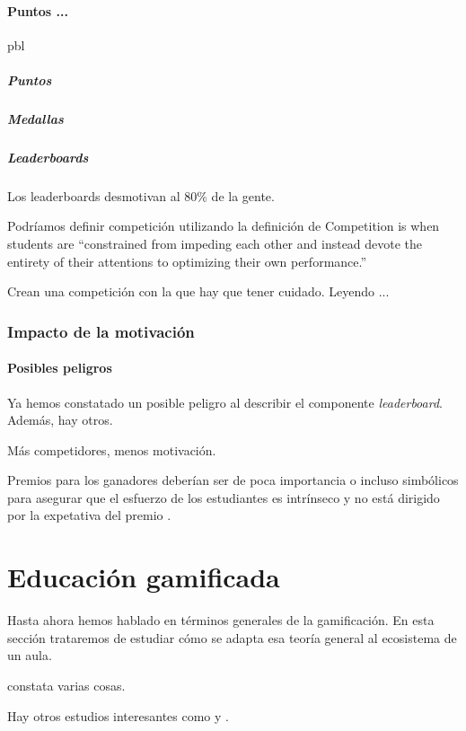 \paragraph{Puntos ...} \gls{pbl}

\subparagraph*{Puntos}

\subparagraph*{Medallas}

\subparagraph*{Leaderboards}

Los leaderboards desmotivan al 80\% de la gente. 

Podríamos definir competición utilizando la definición de \cite{Crawford_CompetitionDef} Competition is when students are “constrained from impeding each other and instead devote the entirety of their attentions to optimizing their own performance.”

Crean una competición con la que hay que tener cuidado. Leyendo \cite{CompetitionInEd}...

\subsubsection{Impacto de la motivación}

\paragraph{Posibles peligros}
\label{PosiblesPeligros}

Ya hemos constatado un posible peligro al describir el componente \textit{leaderboard}. Además, hay otros.

Más competidores, menos motivación. \cite{n-effect}

Premios para los ganadores deberían ser de poca importancia o incluso simbólicos para asegurar que el esfuerzo de los estudiantes es intrínseco y no está dirigido por la expetativa del premio \cite{CompetitionInEd}.

\section{Educación gamificada}

Hasta ahora hemos hablado en términos generales de la gamificación. 
%
En esta sección trataremos de estudiar cómo se adapta esa teoría general al ecosistema de un aula.

\cite{lee2011gamification} constata varias cosas.

Hay otros estudios interesantes como \cite{Hanus2015152} y \cite{ReviewGamificationInEducation}.

